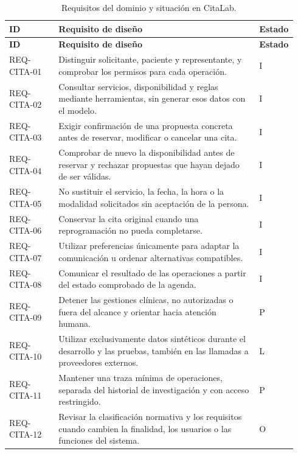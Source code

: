 \begin{longtable}{L{0.17\linewidth}L{0.69\linewidth}L{0.08\linewidth}}
\caption{Requisitos del dominio y situación en CitaLab.}\label{tab:req-dominio-regulado}\\
\toprule
\textbf{ID} & \textbf{Requisito de diseño} & \textbf{Estado} \\
\midrule
\endfirsthead
\toprule
\textbf{ID} & \textbf{Requisito de diseño} & \textbf{Estado} \\
\midrule
\endhead
REQ-CITA-01 & Distinguir solicitante, paciente y representante, y comprobar los permisos para cada operación. & I \\
REQ-CITA-02 & Consultar servicios, disponibilidad y reglas mediante herramientas, sin generar esos datos con el modelo. & I \\
REQ-CITA-03 & Exigir confirmación de una propuesta concreta antes de reservar, modificar o cancelar una cita. & I \\
REQ-CITA-04 & Comprobar de nuevo la disponibilidad antes de reservar y rechazar propuestas que hayan dejado de ser válidas. & I \\
REQ-CITA-05 & No sustituir el servicio, la fecha, la hora o la modalidad solicitados sin aceptación de la persona. & I \\
REQ-CITA-06 & Conservar la cita original cuando una reprogramación no pueda completarse. & I \\
REQ-CITA-07 & Utilizar preferencias únicamente para adaptar la comunicación u ordenar alternativas compatibles. & I \\
REQ-CITA-08 & Comunicar el resultado de las operaciones a partir del estado comprobado de la agenda. & I \\
REQ-CITA-09 & Detener las gestiones clínicas, no autorizadas o fuera del alcance y orientar hacia atención humana. & P \\
REQ-CITA-10 & Utilizar exclusivamente datos sintéticos durante el desarrollo y las pruebas, también en las llamadas a proveedores externos. & L \\
REQ-CITA-11 & Mantener una traza mínima de operaciones, separada del historial de investigación y con acceso restringido. & P \\
REQ-CITA-12 & Revisar la clasificación normativa y los requisitos cuando cambien la finalidad, los usuarios o las funciones del sistema. & O \\
\bottomrule
\end{longtable}
\normalsize
\setlength{\tabcolsep}{6pt}

